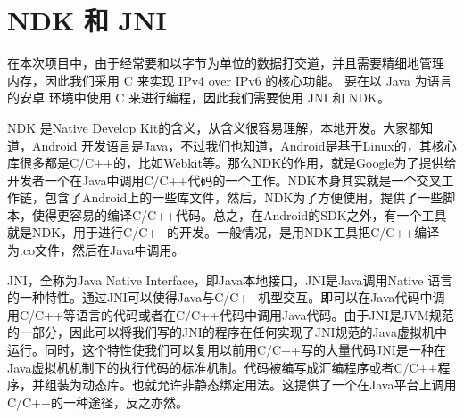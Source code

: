 \section{NDK 和 JNI}
在本次项目中，由于经常要和以字节为单位的数据打交道，并且需要精细地管理 内存，因此我们采用 C 来实现 IPv4 over IPv6 的核心功能。
要在以 Java 为语言的安卓 环境中使用 C 来进行编程，因此我们需要使用 JNI 和 NDK。

NDK 是Native Develop Kit的含义，从含义很容易理解，本地开发。大家都知道，Android 开发语言是Java，不过我们也知道，Android是基于Linux的，其核心库很多都是C/C++的，比如Webkit等。那么NDK的作用，就是Google为了提供给开发者一个在Java中调用C/C++代码的一个工作。NDK本身其实就是一个交叉工作链，包含了Android上的一些库文件，然后，NDK为了方便使用，提供了一些脚本，使得更容易的编译C/C++代码。总之，在Android的SDK之外，有一个工具就是NDK，用于进行C/C++的开发。一般情况，是用NDK工具把C/C++编译为.co文件，然后在Java中调用。

JNI，全称为Java Native Interface，即Java本地接口，JNI是Java调用Native 语言的一种特性。通过JNI可以使得Java与C/C++机型交互。即可以在Java代码中调用C/C++等语言的代码或者在C/C++代码中调用Java代码。由于JNI是JVM规范的一部分，因此可以将我们写的JNI的程序在任何实现了JNI规范的Java虚拟机中运行。同时，这个特性使我们可以复用以前用C/C++写的大量代码JNI是一种在Java虚拟机机制下的执行代码的标准机制。代码被编写成汇编程序或者C/C++程序，并组装为动态库。也就允许非静态绑定用法。这提供了一个在Java平台上调用C/C++的一种途径，反之亦然。
